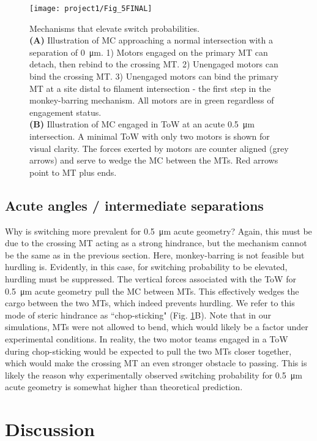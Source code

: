 \begin{figure}
\centering
\texttt{[image: project1/Fig\_5FINAL]}
\caption[Mechanisms that elevate switch probabilities]{Mechanisms that elevate switch probabilities.\\
\textbf{(A)} Illustration of MC approaching a normal intersection with a separation of \SI{0}{\micro\meter}. 1) Motors engaged on the primary MT can detach, then rebind to the crossing MT. 2) Unengaged motors can bind the crossing MT. 3) Unengaged motors can bind the primary MT at a site distal to filament intersection - the first step in the monkey-barring mechanism. All motors are in green regardless of engagement status.\\
\textbf{(B)} Illustration of MC engaged in ToW at an acute \SI{.5}{\micro\meter} intersection. A minimal ToW with only two motors is shown for visual clarity. The forces exerted by motors are counter aligned (grey arrows) and serve to wedge the MC between the MTs. Red arrows point to MT plus ends.}
\label{fig:5}
\end{figure}

\subsection{Acute angles / intermediate separations}

Why is switching more prevalent for \SI{.5}{\micro\meter} acute geometry? Again, this must be due to the crossing MT acting as a strong hindrance, but the mechanism cannot be the same as in the previous section. Here, monkey-barring is not feasible but hurdling is. Evidently, in this case, for switching probability to be elevated, hurdling must be suppressed. The vertical forces associated with the ToW for \SI{.5}{\micro\meter} acute geometry pull the MC between MTs. This effectively wedges the cargo between the two MTs, which indeed prevents hurdling. We refer to this mode of steric hindrance as ``chop-sticking" (Fig. \ref{fig:5}B). Note that in our simulations, MTs were not allowed to bend, which would likely be a factor under experimental conditions. In reality, the two motor teams engaged in a ToW during chop-sticking would be expected to pull the two MTs closer together, which would make the crossing MT an even stronger obstacle to passing. This is likely the reason why experimentally observed switching probability for \SI{.5}{\micro\meter} acute geometry is somewhat higher than theoretical prediction.

\section{Discussion}

